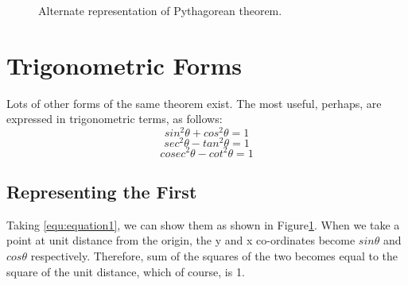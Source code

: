 \documentclass{article}
\begin{document}
\begin{figure}[h]
    \centering
	\caption{Alternate representation of Pythagorean theorem.}
	\label{fig:representation2}
\end{figure}

\section{Trigonometric Forms}
Lots of other forms of the same theorem exist. The most useful, perhaps, are
expressed in trigonometric terms, as follows:
\begin{equation}
sin^2\theta  + cos^2\theta  =1
\label{equ:equation1}
\end{equation}
\begin{equation}
sec^2\theta  - tan^2\theta  =1
\label{equ:equation2}
\end{equation}
\begin{equation}
cosec^2\theta  - cot^2\theta  =1
\label{equ:equation3}
\end{equation}
\subsection{Representing the First}
Taking \ref{equ:equation1}, we can show them as shown in Figure\ref{fig:representation2}. When we take a point at unit distance from the origin, the y and x co-ordinates become $sin \theta$ and $cos \theta$ respectively. Therefore, sum of the squares of the two becomes equal to the square of the unit distance, which of course, is 1.
\end{document}
